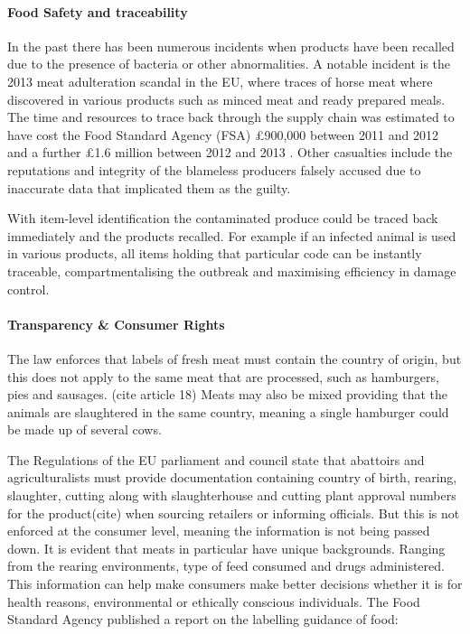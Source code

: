\documentclass[a4paper, 11pt]{article}
\begin{document}
\paragraph{Food Safety and traceability}
In the past there has been numerous incidents when products have been recalled due to the presence of bacteria or other abnormalities. A notable incident is the 2013 meat adulteration scandal in the EU, where traces of horse meat where discovered in various products such as minced meat and ready prepared meals. The time and resources to trace back through the supply chain was estimated to have cost the Food Standard Agency (FSA) \pounds900,000 between 2011 and 2012 and a further \pounds1.6 million between 2012 and 2013 \cite{3}. Other casualties include the reputations and integrity of the blameless producers falsely accused due to inaccurate data that implicated them as the guilty.\cite{horse}

With item-level identification the contaminated produce could be traced back immediately and the products recalled. For example if an infected animal is used in various products, all items holding that particular code can be instantly traceable, compartmentalising the outbreak and maximising efficiency in damage control. 

\paragraph{Transparency \& Consumer Rights}
The law enforces that labels of fresh meat must contain the country of origin, but this does not apply to the same meat that are processed, such as hamburgers, pies and sausages. (cite article 18) Meats may also be mixed providing that the animals are slaughtered in the same country, meaning a single hamburger could be made up of several cows. 

The Regulations of the EU parliament and council state that abattoirs and agriculturalists must provide documentation containing country of birth, rearing, slaughter, cutting along with slaughterhouse and cutting plant approval numbers for the product(cite) when sourcing retailers or informing officials. But this is not enforced at the consumer level, meaning the information is not being passed down. It is evident that meats in particular have unique backgrounds. Ranging from the rearing environments, type of feed consumed and drugs administered. This information can help make consumers make better decisions whether it is for health reasons, environmental or ethically conscious individuals. The Food Standard Agency published a report on the labelling guidance of food:
\end{document}
